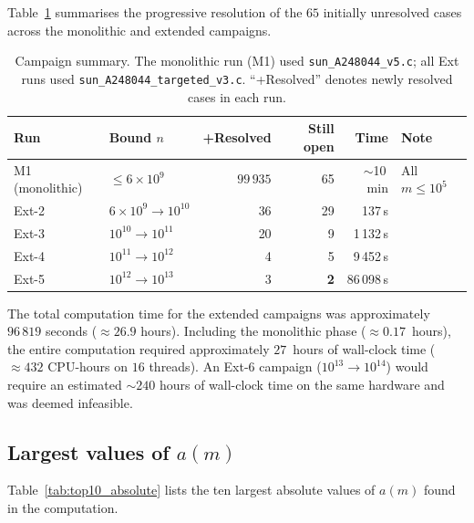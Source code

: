 \documentclass{amsart}
\theoremstyle{definition}
\theoremstyle{remark}
\numberwithin{equation}{section}
\begin{document}
Table~\ref{tab:campaigns} summarises the progressive resolution of
the $65$ initially unresolved cases across the monolithic and
extended campaigns.

\begin{table}[ht]
\centering
\caption{Campaign summary.  The monolithic run (M1) used
\texttt{sun\_A248044\_v5.c}; all Ext runs used
\texttt{sun\_A248044\_targeted\_v3.c}.
``+Resolved'' denotes newly resolved cases in each run.}
\label{tab:campaigns}
\small
\begin{tabular}{llrrrl}
\toprule
Run & Bound $n$ & +Resolved & Still open & Time & Note \\
\midrule
M1 (monolithic) & $\le 6 \times 10^9$
  & $99\,935$ & 65 & $\sim$10\,min & All $m \le 10^5$ \\
Ext-2 & $6 \times 10^9 \to 10^{10}$
  & 36 & 29 & 137\,s & \\
Ext-3 & $10^{10} \to 10^{11}$
  & 20 & 9 & 1\,132\,s & \\
Ext-4 & $10^{11} \to 10^{12}$
  & 4 & 5 & 9\,452\,s & \\
Ext-5 & $10^{12} \to 10^{13}$
  & 3 & \textbf{2} & 86\,098\,s & \\
\bottomrule
\end{tabular}
\end{table}

The total computation time for the extended campaigns was
approximately $96\,819$ seconds ($\approx 26.9$ hours).
Including the monolithic phase ($\approx 0.17$~hours), the entire
computation required approximately $27$~hours of wall-clock time
($\approx 432$ CPU-hours on $16$ threads).
An Ext-6 campaign ($10^{13} \to 10^{14}$) would require an
estimated $\sim 240$ hours of wall-clock time on the same hardware
and was deemed infeasible.

\subsection{Largest values of $a(m)$}

Table~\ref{tab:top10_absolute} lists the ten largest absolute
values of $a(m)$ found in the computation.
\end{document}
